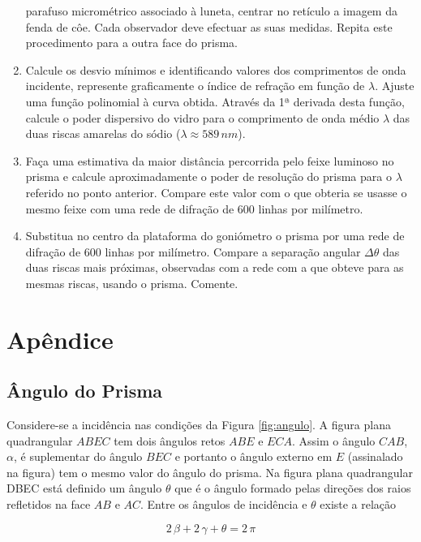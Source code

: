 \documentclass[a4paper,12pt]{article}  %
\begin{document}
\begin{enumerate}
parafuso micrométrico associado à luneta, centrar no retículo a imagem da fenda de côe. Cada observador deve efectuar as suas medidas. Repita este procedimento para a outra face do prisma. 
\item Calcule os desvio mínimos e identificando  valores  dos  comprimentos  de  onda  incidente, represente  graficamente  o 
índice de refração em função de $\lambda$. Ajuste uma função polinomial à curva obtida. Através da 1ª derivada desta função, calcule o poder dispersivo do vidro para o comprimento de onda médio $\lambda$ das 
duas riscas amarelas do sódio ($\lambda \approx 589\,nm$). 
\item Faça uma estimativa da maior distância percorrida pelo feixe luminoso no prisma e calcule 
aproximadamente  o  poder  de  resolução  do  prisma  para  o  $\lambda$ referido  no  ponto  anterior. 
Compare este valor com o que obteria se usasse o mesmo feixe com uma rede de difração 
de 600 linhas por milímetro. 
\item Substitua no centro da plataforma do goniómetro o prisma por uma rede de difração de 
600 linhas por milímetro. Compare a separação angular $\Delta \theta$ das duas riscas mais próximas, 
observadas  com  a  rede  com  a  que  obteve  para  as  mesmas  riscas,  usando  o  prisma. 
Comente. 

\end{enumerate}

\section*{\sf Apêndice}
\subsection*{\sf Ângulo do Prisma}

Considere-se a incidência nas condições da Figura \ref{fig:angulo}.
A figura plana quadrangular $ABEC$ tem dois ângulos retos $ABE$ e $ECA$. Assim o ângulo $CAB$, $\alpha$, é suplementar do ângulo $BEC$ e portanto o ângulo externo em $E$ (assinalado na figura) tem o mesmo valor do ângulo do prisma.
Na figura plana quadrangular DBEC está definido um ângulo $θ$ que é o ângulo formado pelas direções dos raios refletidos na face $AB$ e $AC$. 
Entre os ângulos de incidência e $θ$ existe a relação 

 \begin{equation}
	\label{eq:soma}
	2\, \beta  + 2 \, \gamma + \theta = 2 \, \pi
\end{equation}
\end{document}
